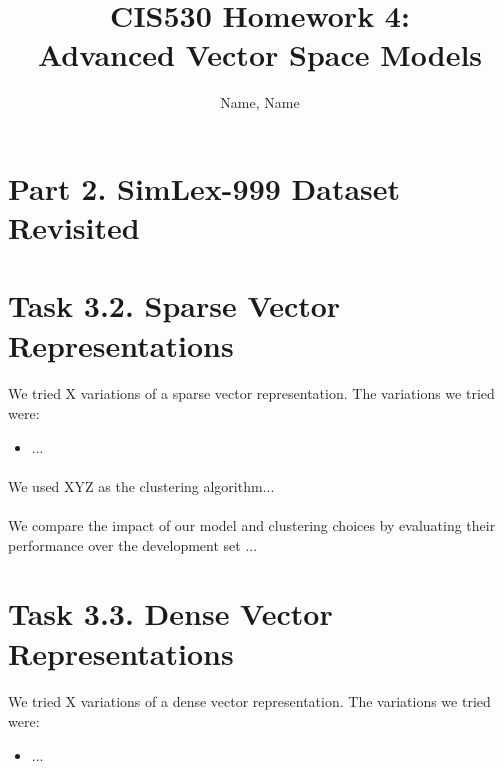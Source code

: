 \documentclass{article}
\title{CIS530 Homework 4: \\ Advanced Vector Space Models}
\author{Name, Name}
\date{}
\begin{document}
\maketitle

\section*{Part 2. SimLex-999 Dataset Revisited}



\newpage
\section*{Task 3.2. Sparse Vector Representations}

\paragraph{}
We tried X variations of a sparse vector representation. The variations we tried were:

\begin{itemize}
\item ...
\end{itemize}

\paragraph{}
We used XYZ as the clustering algorithm...

\paragraph{}
We compare the impact of our model and clustering choices by evaluating their performance over the development set ...


\newpage
\section*{Task 3.3. Dense Vector Representations}

\paragraph{}
We tried X variations of a dense vector representation. The variations we tried were:

\begin{itemize}
\item ...
\end{itemize}
\end{document}
